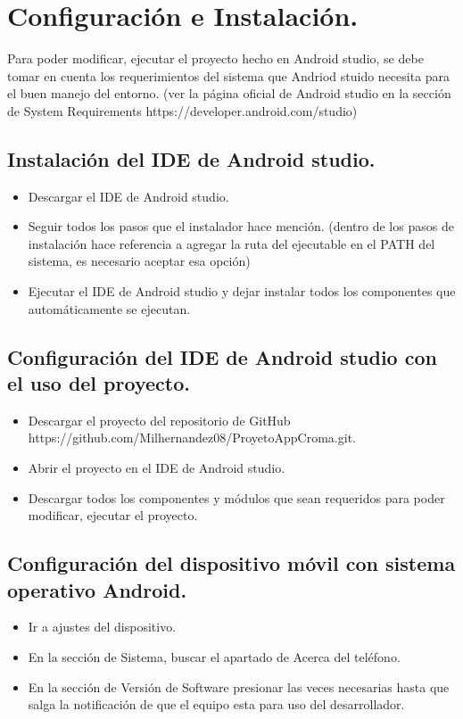 \section{Configuración e Instalación.}
Para poder modificar, ejecutar el proyecto hecho en Android studio, se debe tomar en cuenta los requerimientos del sistema que Andriod stuido necesita para el buen manejo del entorno. (ver la página oficial de Android studio en la sección de System Requirements https://developer.android.com/studio)

\subsection{Instalación del IDE de Android studio.}
\begin{itemize}
    \item Descargar el IDE de Android studio.
    \item Seguir todos los pasos que el instalador hace mención. (dentro de los pasos de instalación hace referencia a agregar la ruta del ejecutable en el PATH del sistema, es necesario aceptar esa opción)
    \item Ejecutar el IDE de Android studio y dejar instalar todos los componentes que automáticamente se ejecutan.
\end{itemize}

\subsection{Configuración del IDE de Android studio con el uso del proyecto.}
\begin{itemize}
\item Descargar el proyecto del repositorio de GitHub \\ https://github.com/Milhernandez08/ProyetoAppCroma.git.
    \item Abrir el proyecto en el IDE de Android studio.
    \item Descargar todos los componentes y módulos que sean requeridos para poder modificar, ejecutar el proyecto.
\end{itemize}

\subsection{Configuración del dispositivo móvil con sistema operativo Android.}
\begin{itemize}
    \item Ir a ajustes del dispositivo.
    \item En la sección de Sistema, buscar el apartado de Acerca del teléfono.
    \item En la sección de Versión de Software presionar las veces necesarias hasta que salga la notificación de que el equipo esta para uso del desarrollador.
\end{itemize}